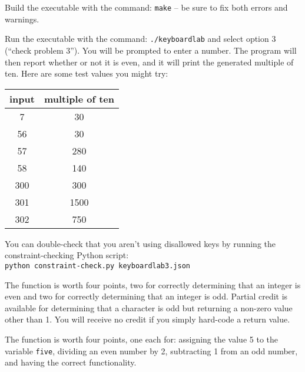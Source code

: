 Build the executable with the command: \texttt{make} -- be sure to fix both errors and warnings.

Run the executable with the command: \texttt{./keyboardlab} and select option 3 (``check problem 3'').
You will be prompted to enter a number.
The program will then report whether or not it is even, and it will print the generated multiple of ten.
Here are some test values you might try:

\begin{center}
    \begin{tabular}{cc}
        input   & multiple of ten \\ \hline
        7       & 30    \\
        56      & 30    \\
        57      & 280   \\
        58      & 140   \\
        300     & 300   \\
        301     & 1500  \\
        302     & 750   \\
    \end{tabular}
\end{center}

You can double-check that you aren't using disallowed keys by running the constraint-checking Python script: \\
\texttt{python constraint-check.py keyboardlab3.json}

The  function is worth four points, two for correctly determining that an integer is even and  two for correctly determining that an integer is odd.
Partial credit is available for determining that a character is odd but returning a non-zero value other than 1.
You will receive no credit if you simply hard-code a return value.

The  function is worth four points, one each for: assigning the value 5 to the variable \lstinline{five}, dividing an even number by 2, subtracting 1 from an odd number, and having the correct functionality.
